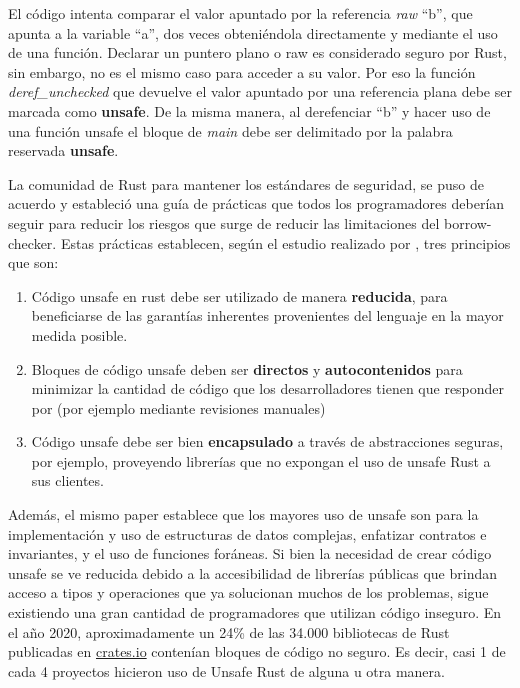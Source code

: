 El código intenta comparar el valor apuntado por la referencia \textit{raw} ``b'', que apunta a la variable ``a'', dos veces obteniéndola directamente y mediante el uso de una función. Declarar un puntero plano o raw es considerado seguro por Rust, sin embargo, no es el mismo caso para acceder a su valor. Por eso la función \textit{deref\_unchecked} que devuelve el valor apuntado por una referencia plana debe ser marcada como \textbf{unsafe}. De la misma manera, al derefenciar ``b'' y hacer uso de una función unsafe el bloque de \textit{main} debe ser delimitado por la palabra reservada \textbf{unsafe}.

La comunidad de Rust para mantener los estándares de seguridad, se puso de acuerdo y estableció una guía de prácticas que todos los programadores deberían seguir para reducir los riesgos que surge de reducir las limitaciones del borrow-checker. Estas prácticas establecen, según el estudio realizado por \cite{astrauskas2020programmers}, tres principios que son:
\begin{enumerate}
  \item Código unsafe en rust debe ser utilizado de manera \textbf{reducida}, para beneficiarse de las garantías inherentes provenientes del lenguaje en la mayor medida posible.
  \item Bloques de código unsafe deben ser \textbf{directos} y \textbf{autocontenidos} para minimizar la cantidad de código que los desarrolladores tienen que responder por (por ejemplo mediante revisiones manuales)
  \item Código unsafe debe ser bien \textbf{encapsulado} a través de abstracciones seguras, por ejemplo, proveyendo librerías que no expongan el uso de unsafe Rust a sus clientes.
\end{enumerate}

Además, el mismo paper establece que los mayores uso de unsafe son para la implementación y uso de estructuras de datos complejas, enfatizar contratos e invariantes, y el uso de funciones foráneas. Si bien la necesidad de crear código unsafe se ve reducida debido a la accesibilidad de librerías públicas que brindan acceso a tipos y operaciones que ya solucionan muchos de los problemas, sigue existiendo una gran cantidad de programadores que utilizan código inseguro. En el año 2020, aproximadamente un 24\% de las 34.000 bibliotecas de Rust publicadas en \url{crates.io} contenían bloques de código no seguro. Es decir, casi 1 de cada 4 proyectos hicieron uso de Unsafe Rust de alguna u otra manera.

